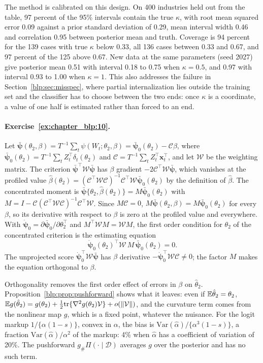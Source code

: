The method is calibrated on this design. On 400 industries held out from the table, 97 percent of the 95\% intervals contain the true $\kappa$, with root mean squared error 0.09 against a prior standard deviation of 0.29, mean interval width 0.46 and correlation 0.95 between posterior mean and truth. Coverage is 94 percent for the 139 cases with true $\kappa$ below 0.33, all 136 cases between 0.33 and 0.67, and 97 percent of the 125 above 0.67. New data at the same parameters (seed 2027) give posterior mean 0.51 with interval 0.18 to 0.75 when $\kappa = 0.5$, and 0.97 with interval 0.93 to 1.00 when $\kappa = 1$. This also addresses the failure in Section~\ref{blp:sec:misspec}, where partial internalization lies outside the training set and the classifier has to choose between the two ends: once $\kappa$ is a coordinate, a value of one half is estimated rather than forced to an end.

\paragraph{Exercise~\ref{ex:chapter_blp:10}.} Let $\bar{\bm\psi}(\theta_2,\beta)=T^{-1}\sum_t\psi(W_t;\theta_2,\beta)=\bar{\bm\psi}_0(\theta_2)-\mathcal C\beta$, where $\bar{\bm\psi}_0(\theta_2)=T^{-1}\sum_tZ_t^\top\delta_t(\theta_2)$ and $\mathcal C=T^{-1}\sum_tZ_t^\top\bm x_t^\top$, and let $\mathcal W$ be the weighting matrix. The criterion $\bar{\bm\psi}^\top\mathcal W\bar{\bm\psi}$ has $\beta$ gradient $-2\mathcal C^\top\mathcal W\bar{\bm\psi}$, which vanishes at the profiled value $\hat\beta(\theta_2)=(\mathcal C^\top\mathcal W\mathcal C)^{-1}\mathcal C^\top\mathcal W\bar{\bm\psi}_0(\theta_2)$ by the definition of $\hat\beta$. The concentrated moment is $\bar{\bm\psi}\{\theta_2,\hat\beta(\theta_2)\}=M\bar{\bm\psi}_0(\theta_2)$ with $M=I-\mathcal C(\mathcal C^\top\mathcal W\mathcal C)^{-1}\mathcal C^\top\mathcal W$. Since $M\mathcal C=0$, $M\bar{\bm\psi}(\theta_2,\beta)=M\bar{\bm\psi}_0(\theta_2)$ for every $\beta$, so its derivative with respect to $\beta$ is zero at the profiled value and everywhere. With $\dot{\bm\psi}_0=\partial\bar{\bm\psi}_0/\partial\theta_2^\top$ and $M^\top\mathcal WM=\mathcal WM$, the first order condition for $\theta_2$ of the concentrated criterion is the estimating equation
\[
\dot{\bm\psi}_0(\theta_2)^\top\mathcal W\,M\,\bar{\bm\psi}_0(\theta_2)=0 .
\]
The unprojected score $\dot{\bm\psi}_0^\top\mathcal W\bar{\bm\psi}$ has $\beta$ derivative $-\dot{\bm\psi}_0^\top\mathcal W\mathcal C\neq0$; the factor $M$ makes the equation orthogonal to $\beta$.

Orthogonality removes the first order effect of errors in $\beta$ on $\hat\theta_2$. Proposition~\ref{blp:prop:pushforward} shows what it leaves: even if $\mathbb{E}\hat\theta_2=\theta_2$, $\mathbb{E} g(\hat\theta_2)=g(\theta_2)+\tfrac12\mathrm{tr}\{\nabla^2g(\theta_2)\mathcal V\}+o(\lVert\mathcal V\rVert)$, and the curvature term comes from the nonlinear map $g$, which is a fixed point, whatever the nuisance. For the logit markup $1/\{\alpha(1-s)\}$, convex in $\alpha$, the bias is $\mathrm{Var}(\hat\alpha)/\{\alpha^3(1-s)\}$, a fraction $\mathrm{Var}(\hat\alpha)/\alpha^2$ of the markup: 4\% when $\hat\alpha$ has a coefficient of variation of 20\%. The pushforward $g_\#\Pi(\cdot\mid\mathcal D)$ averages $g$ over the posterior and has no such term.
